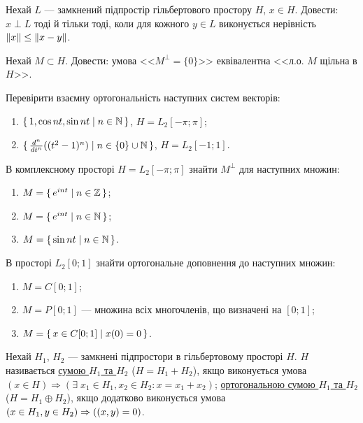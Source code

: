 \begin{exercise}
    Нехай $L$ --- замкнений підпростір гільбертового простору $H$, $x \in H$. Довести:
    $x \perp L$ тоді й тільки тоді, коли для кожного $y \in L$ виконується нерівність $\left\lVert x\right\rVert \leq \left\lVert x-y\right\rVert$.
\end{exercise}

\begin{exercise}
    Нехай $M \subset H$. Довести: умова <<$M^\perp = \{0\}$>> еквівалентна <<$\text{л.о. } M$ щільна в $H$>>.
\end{exercise}

\begin{exercise}
    Перевірити взаємну ортогональність наступних систем векторів:
    \begin{enumerate}[label=\ukr*)]
        \item $\set{1, \cos{nt}, \sin{nt} \mid n \in \mathbb{N}}$, $H = L_2 [-\pi; \pi]$;
        \item $\set{\frac{d^n}{dt^n} ((t^2-1)^n) \mid n \in \{0 \} \cup \mathbb{N}}$, $H = L_2 [-1; 1]$.
    \end{enumerate}
\end{exercise}

\begin{exercise}
    В комплексному просторі $H = L_2 [-\pi; \pi]$ знайти $M^\perp$ для наступних множин:
    \begin{enumerate}[label=\ukr*)]
        \item $M = \set{e^{i n t} \mid n \in \mathbb{Z}}$;
        \item $M = \set{e^{i n t} \mid n \in \mathbb{N}}$;
        \item $M = \set{\sin{n t} \mid n \in \mathbb{N}}$.
    \end{enumerate}
\end{exercise}

\begin{exercise}
    В просторі $L_2 [0; 1]$ знайти ортогональне доповнення до наступних множин:
    \begin{enumerate}[label=\ukr*)]
        \item $M = C[0; 1]$;
        \item $M = P[0;1]$ --- множина всіх многочленів, що визначені на $[0; 1]$;
        \item $M = \set{ x \in C[0;1] \mid x(0) = 0}$.
    \end{enumerate}
\end{exercise}

\begin{theory}
    Нехай $H_1$, $H_2$ --- замкнені підпростори в гільбертовому просторі $H$.
    $H$ називається \uline{сумою $H_1$ та $H_2$} ($H = H_1 + H_2$), якщо виконується умова
    $(x \in H) \Rightarrow (\exists \; x_1 \in H_1, x_2 \in H_2 : x = x_1 + x_2)$;
    \uline{ортогональною сумою $H_1$ та $H_2$} ($H = H_1 \oplus H_2$), якщо додатково виконується умова
    $(x \in H_1, y \in H_2) \Rightarrow ( \left(x, y\right) = 0)$.
\end{theory}